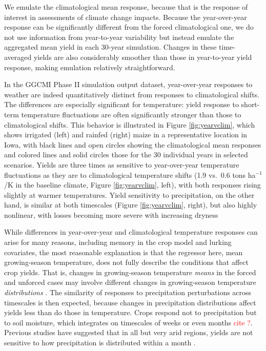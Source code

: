 We emulate the climatological mean response, because that is the response of interest in assessments of climate change impacts. Because the year-over-year response can be significantly different from the forced climatological one, we do not use information from year-to-year variability but instead emulate the aggregated mean yield in each 30-year simulation. Changes in these time-averaged yields are also considerably smoother than those in year-to-year yield response, making emulation relatively straightforward. 

In the GGCMI Phase II simulation output dataset, year-over-year responses to weather are indeed quantitatively distinct from responses to climatological shifts. 
The differences are especially significant for temperature: yield response to short-term temperature fluctuations are often significantly stronger than those to climatological shifts.
This behavior is illustrated in Figure \ref{fig:yearvclim}, which shows irrigated (left) and rainfed (right) maize in a representative location in Iowa, with black lines and open circles showing the climatological mean responses and colored lines and solid circles those for the 30 individual years in selected scenarios. Yields are three times as sensitive to year-over-year temperature fluctuations as they are to climatological  temperature shifts (1.9 vs.\ 0.6 tons ha$^{-1}$/K in the baseline climate, Figure \ref{fig:yearvclim}, left), with both responses rising slightly at warmer temperatures.
Yield sensitivity to precipitation, on the other hand, is similar at both timescales (Figure \ref{fig:yearvclim}, right), but also highly nonlinear, with losses becoming more severe with increasing dryness

While differences in year-over-year and climatological temperature responses can arise for many reasons, including memory in the crop model and lurking covariates, the most reasonable explanation is that the regressor here, mean growing-season temperature, does not fully describe the conditions that affect crop yields. That is, changes in growing-season temperature \textit{means} in the forced and unforced cases may involve different changes in growing-season temperature \textit{distributions} \citep[e.g.][]{Ruane2016}. 
The similarity of responses to precipitation perturbations across timescales is then expected, because changes in precipitation distributions affect yields less than do those in temperature. 
Crops respond not to precipitation but to soil moisture, which integrates on timescales of weeks or even months \textcolor{red}{cite ?}. 
Previous studies have suggested that in all but very arid regions, yields are not sensitive to how precipitation is distributed within a month \citep{Glotter14}.


